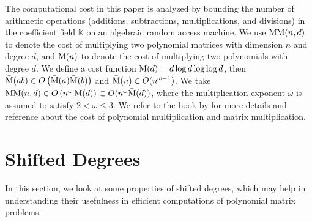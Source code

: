 The computational cost in this paper is analyzed by bounding the number
of arithmetic operations (additions, subtractions, multiplications,
and divisions) in the coefficient field $\mathbb{K}$ on an algebraic
random access machine. We use $\MM(n,d)$ to denote the cost of multiplying
two polynomial matrices with dimension $n$ and degree $d$, and $\M(n)$
to denote the cost of multiplying two polynomials with degree $d$.
We define a cost function $\bar{\M}(d)=d\log d\log\log d$, then $\bar{\M}(ab)\in O\left(\bar{\M}(a)\bar{\M}(b)\right)$
and $\bar{\M}(n)\in O(n^{\omega-1})$. We take $\MM(n,d)\in O\left(n^{\omega}\M(d)\right)\subset O(n^{\omega}\bar{\M}(d))$,
where the multiplication exponent $\omega$ is assumed to satisfy
$2<\omega\le3$. We refer to the book by \citet{vonzurgathen} for
more details and reference about the cost of polynomial multiplication
and matrix multiplication.


\section{Shifted Degrees}

In this section, we look at some properties of shifted degrees, which
may help in understanding their usefulness in efficient computations
of polynomial matrix problems.


